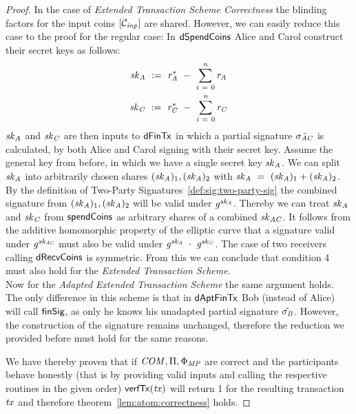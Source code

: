 \begin{proof}
    In the case of \emph{Extended Transaction Scheme Correctness} the blinding factors for the input coins $[\mathcal{C}_{\mathit{inp}}]$ are shared.
    However, we can easily reduce this case to the proof for the regular case:
    In $\mathsf{dSpendCoins}$ Alice and Carol construct their secret keys as follows:
    \begin{gather}
        \mathit{sk}_{\mathit{A}} ~:=~ \mathit{r}_{\mathit{A}}^* ~-~ \sum_{\mathit{i} ~=~ 0}^{\mathit{n}} \mathit{r}_{\mathit{A}} \\
        \mathit{sk}_{\mathit{C}} ~:=~ \mathit{r}_{\mathit{C}}^* ~-~ \sum_{\mathit{i} ~=~ 0}^{\mathit{n}} \mathit{r}_{\mathit{C}}
    \end{gather}
    $\mathit{sk}_{\mathit{A}}$ and $\mathit{sk}_{\mathit{C}}$ are then inputs to $\mathsf{dFinTx}$ in which a partial signature $\tilde{\sigma_{\mathit{A}\mathit{C}}}$ is calculated, by both Alice and Carol signing with their secret key.
    Assume the general key from before, in which we have a single secret key $\mathit{sk}_{\mathit{A}}$.
    We can split $\mathit{sk}_{\mathit{A}}$ into arbitrarily chosen shares $(\mathit{sk}_{\mathit{A}})_1, (\mathit{sk}_{\mathit{A}})_2$ with $\mathit{sk}_{\mathit{A}} ~=~ (\mathit{sk}_{\mathit{A}})_1 + (\mathit{sk}_{\mathit{A}})_2$.
    By the definition of Two-Party Signatures~\ref{def:sig:two-party-sig} the combined signature from $(\mathit{sk}_{\mathit{A}})_1, (\mathit{sk}_{\mathit{A}})_2$ will be valid under $\mathit{g}^{\mathit{sk}_{\mathit{A}}}$.
    Thereby we can treat $\mathit{sk}_{\mathit{A}}$ and $\mathit{sk}_{\mathit{C}}$ from $\mathsf{spendCoins}$ as arbitrary shares of a combined $\mathit{sk}_{\mathit{A}\mathit{C}}$.
    It follows from the additive homomorphic property of the elliptic curve that a signature valid under $\mathit{g}^{\mathit{sk}_{\mathit{A}\mathit{C}}}$ must also be valid under $\mathit{g}^{\mathit{sk}_{\mathit{A}}} ~\cdot~ \mathit{g}^{\mathit{sk}_{\mathit{C}}}$.
    The case of two receivers calling $\mathsf{dRecvCoins}$ is symmetric.
    From this we can conclude that condition 4 must also hold for the \emph{Extended Transaction Scheme}. \\
    Now for the \emph{Adapted Extended Transaction Scheme} the same argument holds.
    The only difference in this scheme is that in $\mathsf{dAptFinTx}$ Bob (instead of Alice) will call $\mathsf{finSig}$, as only he knows his unadapted partial signature $\tilde{\sigma_{\mathit{B}}}$.
    However, the construction of the signature remains unchanged, therefore the reduction we provided before must hold for the same reasons.

    We have thereby proven that if $\mathit{COM}, \Pi, \Phi_{\mathit{MP}}$ are correct and the participants behave honestly (that is by providing valid inputs and calling the respective routines in the given order) $\mathsf{verfTx}(\mathit{tx})$ will return 1 for the resulting transaction $\mathit{tx}$ and therefore theorem~\ref{lem:atom:correctness} holds.
\end{proof}

